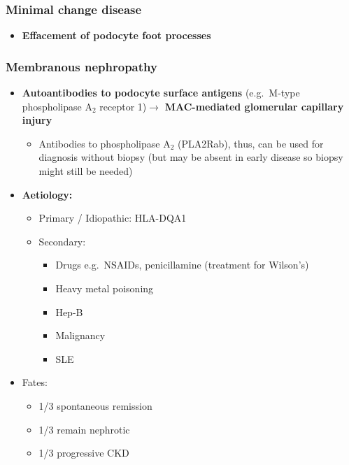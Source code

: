 \documentclass[
  12pt,
]{memoir}
\providecommand{\tightlist}{%
  \setlength{\itemsep}{0pt}\setlength{\parskip}{0pt}}
\begin{document}
\hypertarget{minimal-change-disease}{%
\subsubsection{Minimal change disease}\label{minimal-change-disease}}

\begin{itemize}
\tightlist
\item
  \textbf{Effacement of podocyte foot processes}
\end{itemize}

\hypertarget{membranous-nephropathy}{%
\subsubsection{Membranous nephropathy}\label{membranous-nephropathy}}

\begin{itemize}
\tightlist
\item
  \textbf{Autoantibodies to podocyte surface antigens} (e.g.~M-type
  phospholipase A\(_2\) receptor 1)\(\rightarrow\) \textbf{MAC-mediated
  glomerular capillary injury}

  \begin{itemize}
  \tightlist
  \item
    Antibodies to phospholipase A\(_2\) (PLA2Rab), thus, can be used for
    diagnosis without biopsy (but may be absent in early disease so
    biopsy might still be needed)
  \end{itemize}
\item
  \textbf{Aetiology:}

  \begin{itemize}
  \tightlist
  \item
    Primary / Idiopathic: HLA-DQA1
  \item
    Secondary:

    \begin{itemize}
    \tightlist
    \item
      Drugs e.g.~NSAIDs, penicillamine (treatment for Wilson's)
    \item
      Heavy metal poisoning
    \item
      Hep-B
    \item
      Malignancy
    \item
      SLE
    \end{itemize}
  \end{itemize}
\item
  Fates:

  \begin{itemize}
  \tightlist
  \item
    1/3 spontaneous remission
  \item
    1/3 remain nephrotic
  \item
    1/3 progressive CKD
  \end{itemize}
\end{itemize}
\end{document}
